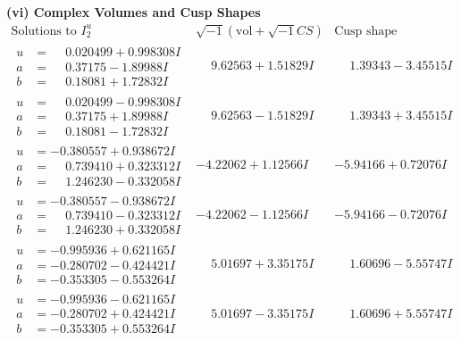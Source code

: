 \documentclass[1p]{elsarticle_modified}
\theoremstyle{definition}
\newcommand{\I}{\sqrt{-1}}
\begin{document}
\newpage\flushleft \textbf{(vi) Complex Volumes and Cusp Shapes}
$$\begin{array}{c|c|c}  
\text{Solutions to }I^u_{2}& \I (\text{vol} + \sqrt{-1}CS) & \text{Cusp shape}\\
 \hline 
\begin{aligned}
u &= \phantom{-}0.020499 + 0.998308 I \\
a &= \phantom{-}0.37175 - 1.89988 I \\
b &= \phantom{-}0.18081 + 1.72832 I\end{aligned}
 & \phantom{-}9.62563 + 1.51829 I & \phantom{-}1.39343 - 3.45515 I \\ \hline\begin{aligned}
u &= \phantom{-}0.020499 - 0.998308 I \\
a &= \phantom{-}0.37175 + 1.89988 I \\
b &= \phantom{-}0.18081 - 1.72832 I\end{aligned}
 & \phantom{-}9.62563 - 1.51829 I & \phantom{-}1.39343 + 3.45515 I \\ \hline\begin{aligned}
u &= -0.380557 + 0.938672 I \\
a &= \phantom{-}0.739410 + 0.323312 I \\
b &= \phantom{-}1.246230 - 0.332058 I\end{aligned}
 & -4.22062 + 1.12566 I & -5.94166 + 0.72076 I \\ \hline\begin{aligned}
u &= -0.380557 - 0.938672 I \\
a &= \phantom{-}0.739410 - 0.323312 I \\
b &= \phantom{-}1.246230 + 0.332058 I\end{aligned}
 & -4.22062 - 1.12566 I & -5.94166 - 0.72076 I \\ \hline\begin{aligned}
u &= -0.995936 + 0.621165 I \\
a &= -0.280702 - 0.424421 I \\
b &= -0.353305 - 0.553264 I\end{aligned}
 & \phantom{-}5.01697 + 3.35175 I & \phantom{-}1.60696 - 5.55747 I \\ \hline\begin{aligned}
u &= -0.995936 - 0.621165 I \\
a &= -0.280702 + 0.424421 I \\
b &= -0.353305 + 0.553264 I\end{aligned}
 & \phantom{-}5.01697 - 3.35175 I & \phantom{-}1.60696 + 5.55747 I \\ \hline\begin{aligned}

\end{aligned}
\end{array}$$
\end{document}
